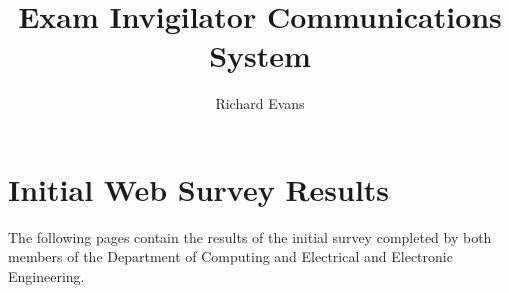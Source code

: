 \documentclass[a4paper,12pt,twoside]{report}
\begin{document}
\title{\LARGE {\bf Exam Invigilator Communications System}\\
 \vspace*{6mm}
}

\author{Richard Evans}

\normallinespacing
\maketitle

\preface




\body












\appendix





\label{ch:appendix}

\chapter{Initial Web Survey Results}
\label{sec:survey_results}

The following pages contain the results of the initial survey completed by both members of the Department of Computing and Electrical and Electronic Engineering.


\end{document}
